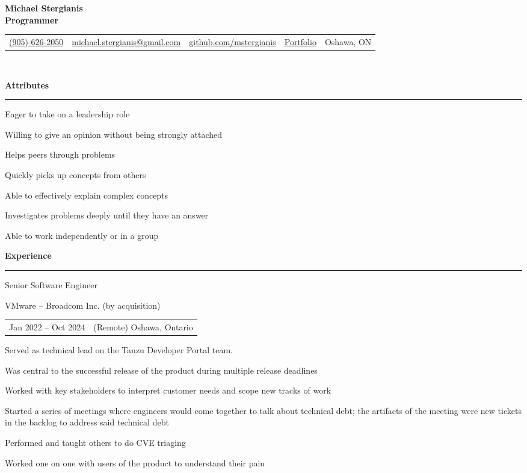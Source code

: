 \documentclass[letterpaper]{article}
\makeatletter
\newcommand{\primary}{\color{primary}}
\newcommand{\primarydark}{\color{primarydark}}
\newcommand{\complementary}{\color{complementary}}
\newcommand{\mapMarker}{\faMapMarker*[alt]}
\newcommand{\email}
{\faEnvelope \space \href{mailto:michaelstergianis@gmail.com}{michael.stergianis@gmail.com}}
\newcommand{\github}
{\faGithub \space \href{https://github.com/mstergianis}{github.com/mstergianis}}
\newcommand{\phone}
{\faPhone \space \href{tel:+1-905-626-2050}{(905)-626-2050}}
\newcommand{\portfolio}
{\faBriefcase \space \href{https://michael.stergianis.ca}{Portfolio}}
\newcommand{\location}
{\mapMarker \space Oshawa, ON}
\newenvironment{heading}[1]{%
  {\LARGE \primarydark \textbf{#1}}\\ {\complementary
    \rule[5pt]{\linewidth}{0.6pt}}
}
{\par\vspace{8pt}}
\newcommand{\blockend}{\vspace{4pt}}
\newenvironment{experience}[4]{
  { #1 \par}
  {\small \primary #2 \par}
  \begin{tabularx}{\linewidth}{ l l }
    { \small \faCalendar \space #3 } & { \small \mapMarker \space #4 }
  \end{tabularx}%
}{
  \blockend{}
}
\newenvironment{itemize*}%
{\begin{itemize}[topsep=0pt,leftmargin=20pt]%
    \setlength{\itemsep}{0pt}%
    \setlength{\parsep}{0pt}%
    \setlength{\parskip}{0pt}%
    \small%
  }%
  {\end{itemize}}
\makeatother
\begin{document}
{\huge \textbf{Michael Stergianis}}\\
{\large \primary \textbf{Programmer}}
\\

\begingroup
\hypersetup{
  urlcolor=.,
}
\begin{tabularx}{\linewidth}{ l l l l l }
  \phone & \email & \github & \portfolio & \location \\
\end{tabularx}\\
\endgroup

\begin{minipage}[t]{0.59\textwidth}%
  \begin{heading}{Attributes}
    \begin{itemize*}
    \item Eager to take on a leadership role
    \item Willing to give an opinion without being strongly attached
    \item Helps peers through problems
    \item Quickly picks up concepts from others
    \item Able to effectively explain complex concepts
    \item Investigates problems deeply until they have an answer
    \item Able to work independently or in a group
    \end{itemize*}
  \end{heading}
  \begin{heading}{Experience}%
    \begin{experience}{Senior Software Engineer}
      {VMware -- Broadcom Inc. (by acquisition)}
      {Jan 2022 -- Oct 2024}
      {(Remote) Oshawa, Ontario}
      Served as technical lead on the Tanzu Developer Portal team.
      \begin{itemize*}
      \item Was central to the successful release of the product during multiple
        release deadlines
      \item Worked with key stakeholders to interpret customer needs and scope
        new tracks of work
      \item Started a series of meetings where engineers would come together to
        talk about technical debt; the artifacts of the meeting were new tickets
        in the backlog to address said technical debt
      \item Performed and taught others to do CVE triaging
      \item Worked one on one with users of the product to understand their pain

\end{itemize*}
\end{experience}
\end{heading}
\end{minipage}
\end{document}
